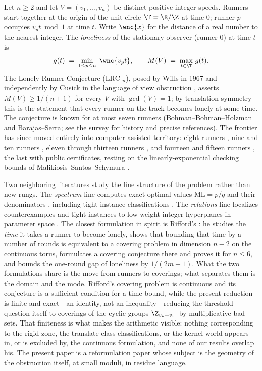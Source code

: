 Let $n\ge 2$ and let $V=(v_1,\dots,v_n)$ be distinct positive integer
speeds. Runners start together at the origin of the unit circle
$\T=\R/\Z$ at time $0$; runner $p$ occupies $v_p t \bmod 1$ at time $t$.
Write $\wnc{x}$ for the distance of a real number to the nearest integer.
The \emph{loneliness} of the stationary observer (runner $0$) at time $t$
is
\[
g(t)\;=\;\min_{1\le p\le n}\;\wnc{v_p t},
\qquad
M(V)\;=\;\max_{t\in\T}\,g(t).
\]
The Lonely Runner Conjecture ($\mathrm{LRC}$-$_n$), posed by Wills in 1967
and independently by Cusick in the language of view obstruction
\cite{PS-survey,Wills,Cusick1973}, asserts $M(V)\ge 1/(n{+}1)$ for every $V$ with
$\gcd(V)=1$; by translation symmetry this is the statement that every
runner on the track becomes lonely at some time. The conjecture is known
for at most seven runners (Bohman--Bohman--Holzman and
Barajas--Serra; see the survey \cite{PS-survey} for history and precise
references). The frontier has since moved entirely into computer-assisted
territory: eight runners \cite{Rosenfeld8}, nine and ten runners
\cite{Trakulthongchai}, eleven through thirteen runners
\cite{Sungkawichai}, and fourteen and fifteen runners \cite{Allikvere},
the last with public certificates, resting on the linearly-exponential
checking bounds of Malikiosis--Santos--Schymura \cite{MSS}.

Two neighboring literatures study the fine structure of the problem rather
than new rungs. The \emph{spectrum} line computes exact optimal values
$\mathrm{ML}=p/q$ and their denominators
\cite{Kravitz,FanSun,GiriKravitz,Cordella}, including tight-instance
classifications \cite{Zhang}. The \emph{relations} line localizes
counterexamples and tight instances to low-weight integer hyperplanes in
parameter space \cite{BeckEverett}. The closest formulation in spirit is
Rifford's \cite{Rifford}: he studies the \emph{time} it takes a runner to
become lonely, shows that bounding that time by a number of rounds is
equivalent to a covering problem in dimension $n-2$ on the continuous torus,
formulates a covering conjecture there and proves it for $n\le 6$, and
bounds the one-round gap of loneliness by $1/(2m-1)$. What the two
formulations share is the move from runners to coverings; what separates
them is the domain and the mode. Rifford's covering problem is continuous
and its conjecture is a sufficient condition for a time bound, while the
present reduction is finite and exact---an identity, not an
inequality---reducing the threshold question itself to coverings of the
cyclic groups $\Z_{v_u+v_w}$ by multiplicative bad sets. That finiteness is
what makes the arithmetic visible: nothing corresponding to the rigid zone,
the translate-class classifications, or the kernel world appears in, or is
excluded by, the continuous formulation, and none of our results overlap
his. The present paper is a reformulation paper whose subject is the
geometry of the obstruction itself, at small moduli, in residue language.


